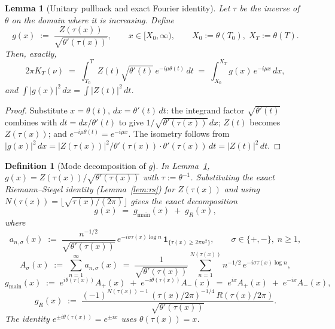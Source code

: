 \documentclass[11pt]{article}
\newtheorem{lemma}{Lemma}
\newtheorem{definition}{Definition}
\begin{document}
\begin{lemma}[Unitary pullback and exact Fourier identity]\label{lem:pullback}
Let $\tau$ be the inverse of $\theta$ on the domain where it is increasing. Define
\[
g(x) \;:=\; \frac{Z(\tau(x))}{\sqrt{\theta'(\tau(x))}},\qquad x \in [X_{0},\infty),\qquad X_{0} := \theta(T_{0}),\; X_{T} := \theta(T).
\]
Then, exactly,
\[
2\pi K_{T}(\nu) \;=\; \int_{T_{0}}^{T} Z(t)\sqrt{\theta'(t)}\,e^{-i\mu\theta(t)}\,dt \;=\; \int_{X_{0}}^{X_{T}} g(x)\, e^{-i\mu x}\, dx,
\]
and $\int |g(x)|^{2}\,dx = \int |Z(t)|^{2}\,dt$.
\end{lemma}

\begin{proof}
Substitute $x = \theta(t)$, $dx = \theta'(t)\,dt$: the integrand factor $\sqrt{\theta'(t)}$ combines with $dt = dx/\theta'(t)$ to give $1/\sqrt{\theta'(\tau(x))}\,dx$; $Z(t)$ becomes $Z(\tau(x))$; and $e^{-i\mu\theta(t)} = e^{-i\mu x}$. The isometry follows from $|g(x)|^{2}\,dx = |Z(\tau(x))|^{2}/\theta'(\tau(x)) \cdot \theta'(\tau(x))\,dt = |Z(t)|^{2}\,dt$.
\end{proof}

\begin{definition}[Mode decomposition of $g$]\label{def:modes}
In Lemma~\ref{lem:pullback}, $g(x) = Z(\tau(x))/\sqrt{\theta'(\tau(x))}$ with $\tau := \theta^{-1}$. Substituting the exact Riemann--Siegel identity (Lemma~\ref{lem:rs}) for $Z(\tau(x))$ and using $N(\tau(x)) = \lfloor\sqrt{\tau(x)/(2\pi)}\rfloor$ gives the exact decomposition
\[
g(x) \;=\; g_{\mathrm{main}}(x) \;+\; g_{R}(x),
\]
where
\[
a_{n,\sigma}(x) \;:=\; \frac{n^{-1/2}}{\sqrt{\theta'(\tau(x))}}\, e^{-i\sigma\tau(x)\log n}\,\mathbf{1}_{\{\tau(x)\ge 2\pi n^{2}\}},
\qquad \sigma\in\{+,-\},\; n\ge 1,
\]
\[
A_{\sigma}(x) \;:=\; \sum_{n=1}^{\infty} a_{n,\sigma}(x) \;=\; \frac{1}{\sqrt{\theta'(\tau(x))}}\sum_{n=1}^{N(\tau(x))} n^{-1/2}\,e^{-i\sigma\tau(x)\log n},
\]
\[
g_{\mathrm{main}}(x) \;:=\; e^{i\theta(\tau(x))}A_{+}(x) \;+\; e^{-i\theta(\tau(x))}A_{-}(x) \;=\; e^{ix}A_{+}(x) \;+\; e^{-ix}A_{-}(x),
\]
\[
g_{R}(x) \;:=\; \frac{(-1)^{N(\tau(x))-1}\,(\tau(x)/2\pi)^{-1/4}\,R(\tau(x)/2\pi)}{\sqrt{\theta'(\tau(x))}}.
\]
The identity $e^{\pm i\theta(\tau(x))} = e^{\pm ix}$ uses $\theta(\tau(x)) = x$.
\end{definition}
\end{document}
